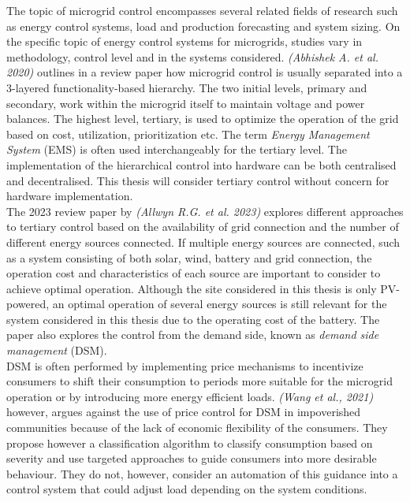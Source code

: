 The topic of microgrid control encompasses several related fields of research such as energy control systems, load and production forecasting and system sizing. On the specific topic of energy control systems for microgrids, studies vary in methodology, control level and in the systems considered. \textit{(Abhishek A. et al. 2020)} outlines in a review paper how microgrid control is usually separated into a 3-layered functionality-based hierarchy. The two initial levels, primary and secondary, work within the microgrid itself to maintain voltage and power balances. The highest level, tertiary, is used to optimize the operation of the grid based on cost, utilization, prioritization etc. The term \textit{Energy Management System} (EMS) is often used interchangeably for the tertiary level. The implementation of the hierarchical control into hardware can be both centralised and decentralised. This thesis will consider tertiary control without concern for hardware implementation.\cite{Abhishek2020-ox}\\

The 2023 review paper by \textit{(Allwyn R.G. et al. 2023)} explores different approaches to tertiary control based on the availability of grid connection and the number of different energy sources connected. If multiple energy sources are connected, such as a system consisting of both solar, wind, battery and grid connection, the operation cost and characteristics of each source are important to consider to achieve optimal operation. Although the site considered in this thesis is only PV-powered, an optimal operation of several energy sources is still relevant for the system considered in this thesis due to the operating cost of the battery. The paper also explores the control from the demand side, known as \textit{demand side management} (DSM).\cite{Allwyn2023-pd}\\

DSM is often performed by implementing price mechanisms to incentivize consumers to shift their consumption to periods more suitable for the microgrid operation\cite{Kanakadhurga2022-op} or by introducing more energy efficient loads\cite{Gilda2018-nh}. \textit{(Wang et al., 2021)} however, argues against the use of price control for DSM in impoverished communities because of the lack of economic flexibility of the consumers. They propose however a classification algorithm to classify consumption based on severity and use targeted approaches to guide consumers into more desirable behaviour. They do not, however, consider an automation of this guidance into a control system that could adjust load depending on the system conditions.\cite{Wang2021-kb}\\

